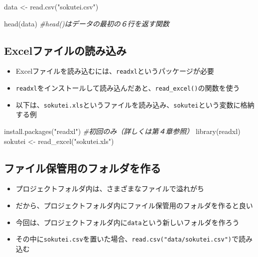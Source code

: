 \documentclass[
]{book}
\newenvironment{Shaded}{\begin{snugshade}}{\end{snugshade}}
\newcommand{\CommentTok}[1]{\textcolor[rgb]{0.56,0.35,0.01}{\textit{#1}}}
\newcommand{\FunctionTok}[1]{\textcolor[rgb]{0.00,0.00,0.00}{#1}}
\newcommand{\NormalTok}[1]{#1}
\newcommand{\OtherTok}[1]{\textcolor[rgb]{0.56,0.35,0.01}{#1}}
\newcommand{\StringTok}[1]{\textcolor[rgb]{0.31,0.60,0.02}{#1}}
\providecommand{\tightlist}{%
  \setlength{\itemsep}{0pt}\setlength{\parskip}{0pt}}
\begin{document}
\begin{Shaded}
\begin{Highlighting}[]
\NormalTok{data }\OtherTok{\textless{}{-}} \FunctionTok{read.csv}\NormalTok{(}\StringTok{"sokutei.csv"}\NormalTok{)}

\FunctionTok{head}\NormalTok{(data) }\CommentTok{\#head()はデータの最初の６行を返す関数}
\end{Highlighting}
\end{Shaded}

\hypertarget{excelux30d5ux30a1ux30a4ux30ebux306eux8aadux307fux8fbcux307f}{%
\subsection{Excelファイルの読み込み}\label{excelux30d5ux30a1ux30a4ux30ebux306eux8aadux307fux8fbcux307f}}

\begin{itemize}
\tightlist
\item
  Excelファイルを読み込むには、\texttt{readxl}というパッケージが必要
\item
  \texttt{readxl}をインストールして読み込んだあと、\texttt{read\_excel()}の関数を使う
\item
  以下は、\texttt{sokutei.xls}というファイルを読み込み、\texttt{sokutei}という変数に格納する例
\end{itemize}

\begin{Shaded}
\begin{Highlighting}[]
\FunctionTok{install.packages}\NormalTok{(}\StringTok{"readxl"}\NormalTok{) }\CommentTok{\#初回のみ（詳しくは第４章参照）}
\FunctionTok{library}\NormalTok{(readxl)}
\NormalTok{sokutei }\OtherTok{\textless{}{-}} \FunctionTok{read\_excel}\NormalTok{(}\StringTok{"sokutei.xls"}\NormalTok{)}
\end{Highlighting}
\end{Shaded}

\hypertarget{ux30d5ux30a1ux30a4ux30ebux4fddux7ba1ux7528ux306eux30d5ux30a9ux30ebux30c0ux3092ux4f5cux308b}{%
\subsection{ファイル保管用のフォルダを作る}\label{ux30d5ux30a1ux30a4ux30ebux4fddux7ba1ux7528ux306eux30d5ux30a9ux30ebux30c0ux3092ux4f5cux308b}}

\begin{itemize}
\tightlist
\item
  プロジェクトフォルダ内は、さまざまなファイルで溢れがち
\item
  だから、プロジェクトフォルダ内にファイル保管用のフォルダを作ると良い
\item
  今回は、プロジェクトフォルダ内に\texttt{data}という新しいフォルダを作ろう
\item
  その中に\texttt{sokutei.csv}を置いた場合、\texttt{read.csv("data/sokutei.csv")}で読み込む
\end{itemize}
\end{document}
